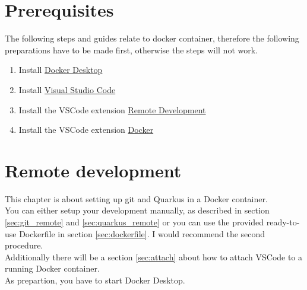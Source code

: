 \chapter{Prerequisites}
    The following steps and guides relate to docker container, therefore the following preparations have to be made first, otherwise the steps will not work.  

    \begin{enumerate}
        \item Install \href{https://www.docker.com/products/docker-desktop/}{Docker Desktop}
        \item Install \href{https://code.visualstudio.com/download}{Visual Studio Code} 
        \item Install the VSCode extension \href{https://marketplace.visualstudio.com/items?itemName=ms-vscode-remote.vscode-remote-extensionpack}{Remote Development} 
        \item Install the VSCode extension \href{https://marketplace.visualstudio.com/items?itemName=ms-azuretools.vscode-docker}{Docker}
    \end{enumerate}    

\chapter{Remote development}
    This chapter is about setting up git and Quarkus in a Docker container. \\
    You can either setup your development manually, as described in section \ref{sec:git_remote} and \ref{sec:quarkus_remote} or you can use the provided ready-to-use Dockerfile in section \ref{sec:dockerfile}. I would recommend the second procedure. \\
    Additionally there will be a section \ref{sec:attach} about how to attach VSCode to a running Docker container. \\
    As prepartion, you have to start Docker Desktop. 

